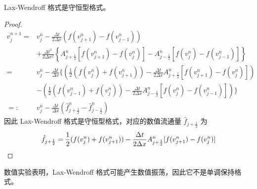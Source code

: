 \begin{example}
    Lax-Wendroff 格式是守恒型格式。
\end{example}

\begin{proof}
    \begin{align*}
        v_j^{n+1} ={} & v_j^n
        - \frac{\Delta t}{2\Delta x} \left(f(v_{j+1}^n)-f(v_{j-1}^n)\right)
        \\ & + \frac{\Delta t^2}{2\Delta x^2}\left\{
        A_{j+\frac12}^n [f(v_{j+1}^n) - f(v_{j}^n)]
        - A_{j-\frac12}^n [f(v_{j}^n) - f(v_{j-1}^n)]
        \right\}
        \\
        ={}           & v_j^n - \frac{\Delta t}{\Delta x}
        \Big\{
        \left(\frac12(f(v_j^n)+f(v_{j+1}^n)) - \frac{\Delta t}{2\Delta x} A_{j+\frac12}^n[f(v_{j+1}^n) - f(v_{j}^n)]\right)
        \\ & -
        \left(\frac12(f(v_{j-1}^n)+f(v_{j}^n)) - \frac{\Delta t}{2\Delta x} A_{j-\frac12}^n[f(v_{j}^n) - f(v_{j-1}^n)]\right)
        \Big\}                                                  \\
        =:{}          & v_j^n - \frac{\Delta t}{\Delta x}\left(
        \hat{f}_{j+\frac12}^n - \hat{f}_{j-\frac12}^n
        \right)
    \end{align*}
    因此 Lax-Wendroff 格式是守恒型格式，对应的数值流通量 $\hat{f}_{j+\frac12}$ 为
    \[
        \hat{f}_{j+\frac12} = \frac12(f(v_j^n)+f(v_{j+1}^n)) - \frac{\Delta t}{2\Delta x} A_{j+\frac12}^n[f(v_{j+1}^n) - f(v_{j}^n)] \qedhere
    \]
\end{proof}

\begin{remark}
    数值实验表明，Lax-Wendroff 格式可能产生数值振荡，因此它不是单调保持格式。
\end{remark}
